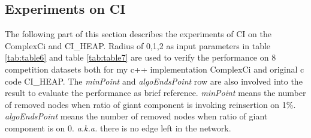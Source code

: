 \documentclass{article}
\begin{document}
	\subsection{Experiments on CI}				
	
	The following part of this section describes the experiments of CI on the ComplexCi and CI\_HEAP. Radius of 0,1,2 as input parameters in table \ref{tab:table6} and table \ref{tab:table7} are used to verify the performance on 8 competition datasets both for my c++ implementation ComplexCi and original c code CI\_HEAP. The \textit{minPoint} and \textit{algoEndsPoint} row are also involved into the result to evaluate the performance as brief reference. \textit{minPoint} means the number of removed nodes when ratio of giant component is invoking reinsertion on 1\%. \textit{algoEndsPoint} means the number of removed nodes when ratio of giant component is on 0. \textit{a.k.a.} there is no edge left in the network.
	
		
	
\end{document}
